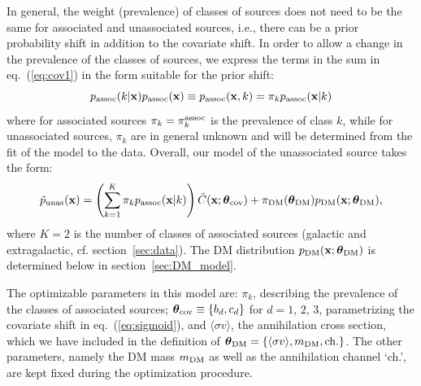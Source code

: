 \documentclass[12pt, a4paper]{article}
\newcommand{\be}{\begin{equation}}
\newcommand{\ee}{\end{equation}}
\newcommand{\bx}{{\bf x}}
\newcommand{\btheta}{\boldsymbol{\theta}}
\newcommand{\sigmav}{\langle \sigma v \rangle}
\begin{document}
In general, the weight (prevalence) of classes of sources does not need to be the same for associated and unassociated sources, i.e., there can be a prior probability shift in addition to the covariate shift.
In order to allow a change in the prevalence of the classes of sources, we express the terms in the sum in eq.~(\ref{eq:cov1}) in the form suitable for the prior shift:
\be
p_{\rm assoc}(k|\bx) p_{\rm assoc}(\bx) \equiv
p_{\rm assoc}(\bx, k) = \pi_k p_{\rm assoc}(\bx|k)
\ee
where for associated sources $\pi_k = \pi_k^{\rm assoc}$ is the prevalence of class $k$, while for unassociated sources, $\pi_k$ are in general unknown and will be determined from the fit of the model to the data.
Overall, our model of the unassociated source takes the form:
\be
\label{eq:mixture}
\tilde{p}_{\rm unas}(\bx) 
= \left(\sum_{k=1}^K \pi_k p_{\rm assoc}(\bx|k)\right) \tilde{C}(\bx; \btheta_{\rm cov}) + \pi_{\rm DM}(\btheta_{\rm DM}) p_{\rm DM}(\bx; \btheta_{\rm DM}),
\ee
where $K = 2$ is the number of classes of associated sources (galactic and extragalactic, cf. section~\ref{sec:data}). 
The DM distribution $p_{\rm DM}(\bx; \btheta_{\rm DM})$ is determined below in section~\ref{sec:DM_model}. 

The optimizable parameters in this model are: $\pi_k$, describing the prevalence of the classes of associated sources; $\btheta_{\rm cov}\equiv\{b_d,c_d\}$ for $d = 1,\,2,\,3$, parametrizing the covariate shift in eq.~(\ref{eq:sigmoid}), and $\sigmav$, the annihilation cross section, which we have included in the definition of $\btheta_{\rm DM}=\{\sigmav,m_{\rm DM},{\rm ch.}\}$. The other parameters, namely the DM mass $m_{\rm DM}$ as well as the annihilation channel `ch.', are kept fixed during the optimization procedure.


\end{document}

